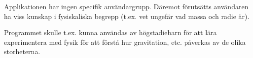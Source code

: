 Applikationen har ingen specifik användargrupp. Däremot förutsätts
användaren ha viss kunskap i fysiskaliska begrepp
(t.ex. vet ungefär vad massa och radie är).

Programmet skulle t.ex. kunna användas av högstadiebarn för att lära
experimentera med fysik för att förstå hur gravitation, etc. påverkas
av de olika storheterna.

